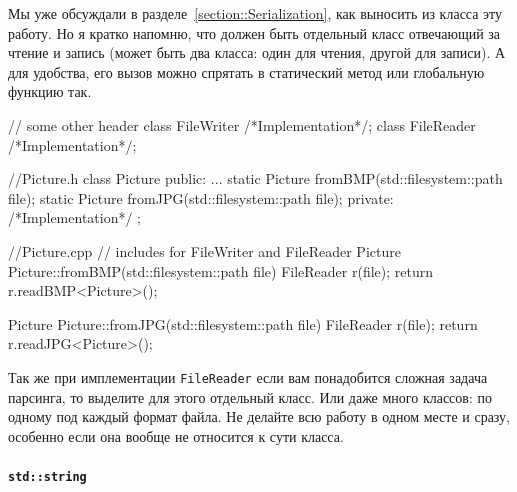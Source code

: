 Мы уже обсуждали в разделе~\ref{section::Serialization}, как выносить из класса эту работу.
Но я кратко напомню, что должен быть отдельный класс отвечающий за чтение и запись (может быть два класса: один для чтения, другой для записи).
А для удобства, его вызов можно спрятать в статический метод или глобальную функцию так.
\begin{cppcode}
// some other header
class FileWriter {/*Implementation*/};
class FileReader {/*Implementation*/};

//Picture.h
class Picture {
public:
  ...
  static Picture fromBMP(std::filesystem::path file);
  static Picture fromJPG(std::filesystem::path file);
private:
  /*Implementation*/
};

//Picture.cpp
// includes for FileWriter and FileReader
Picture Picture::fromBMP(std::filesystem::path file) {
  FileReader r(file);
  return r.readBMP<Picture>();
}

Picture Picture::fromJPG(std::filesystem::path file) {
  FileReader r(file);
  return r.readJPG<Picture>();
}
\end{cppcode}
Так же при имплементации \verb"FileReader" если вам понадобится сложная задача парсинга, то выделите для этого отдельный класс.
Или даже много классов: по одному под каждый формат файла.
Не делайте всю работу в одном месте и сразу, особенно если она вообще не относится к сути класса.

\paragraph{\texttt{std::string}}

